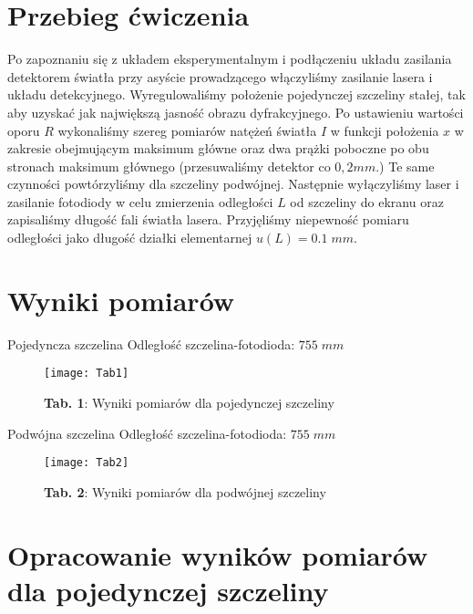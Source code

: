 \documentclass[12pt]{article}
\begin{document}
\section{Przebieg ćwiczenia}
Po zapoznaniu się z układem eksperymentalnym i podłączeniu układu zasilania detektorem światła przy asyście prowadzącego włączyliśmy zasilanie lasera i układu detekcyjnego. Wyregulowaliśmy położenie pojedynczej szczeliny stałej, tak aby uzyskać jak największą jasność obrazu dyfrakcyjnego. Po ustawieniu wartości oporu $R$ wykonaliśmy szereg pomiarów natężeń światła $I$ w funkcji położenia $x$ w zakresie obejmującym maksimum główne oraz dwa prążki poboczne po obu stronach maksimum głównego (przesuwaliśmy detektor co $0,2mm$.) Te same czynności powtórzyliśmy dla szczeliny podwójnej. Następnie wyłączyliśmy laser i zasilanie fotodiody w celu zmierzenia odległości $L$ od szczeliny do ekranu oraz zapisaliśmy długość fali światła lasera. Przyjęliśmy niepewność pomiaru odległości jako długość działki elementarnej $u(L)=0.1\;mm$.
\newpage
\section{Wyniki pomiarów}
\begin{center}
{\Large \;\;\;\;\;\;\;\;\;\;\;\;\;\;\;\;\;\;\;\;Pojedyncza szczelina}  \newline
Odległość szczelina-fotodioda: $755\;mm$
\end{center}
\begin{figure}[H]
\centering
\texttt{[image: Tab1]}
\caption*{\textbf{Tab. 1}: Wyniki pomiarów dla pojedynczej szczeliny }
\end{figure} 
\begin{center}
{\Large \;\;\;\;\;\;\;\;\;\;\;\;\;\;\;\;\;\;\;\;Podwójna szczelina}  \newline
Odległość szczelina-fotodioda: $755\;mm$
\end{center}
\begin{figure}[H]
\centering
\texttt{[image: Tab2]}
\caption*{\textbf{Tab. 2}: Wyniki pomiarów dla podwójnej szczeliny }
\end{figure} 
\section{Opracowanie wyników pomiarów dla pojedynczej szczeliny}
\end{document}
